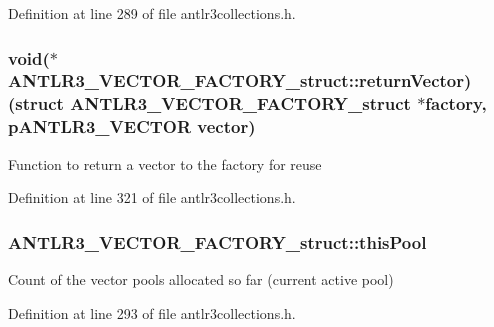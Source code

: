 Definition at line 289 of file antlr3collections.\-h.

\hypertarget{struct_a_n_t_l_r3___v_e_c_t_o_r___f_a_c_t_o_r_y__struct_a682d89800cb9cc07d495788265ad02b5}{
\subsubsection[{return\-Vector}]{\setlength{\rightskip}{0pt plus 5cm}void($\ast$ A\-N\-T\-L\-R3\-\_\-\-V\-E\-C\-T\-O\-R\-\_\-\-F\-A\-C\-T\-O\-R\-Y\-\_\-struct\-::return\-Vector)(struct {\bf A\-N\-T\-L\-R3\-\_\-\-V\-E\-C\-T\-O\-R\-\_\-\-F\-A\-C\-T\-O\-R\-Y\-\_\-struct} $\ast$factory, {\bf p\-A\-N\-T\-L\-R3\-\_\-\-V\-E\-C\-T\-O\-R} {\bf vector})}}\label{struct_a_n_t_l_r3___v_e_c_t_o_r___f_a_c_t_o_r_y__struct_a682d89800cb9cc07d495788265ad02b5}
Function to return a vector to the factory for reuse 

Definition at line 321 of file antlr3collections.\-h.

\hypertarget{struct_a_n_t_l_r3___v_e_c_t_o_r___f_a_c_t_o_r_y__struct_a853f11c3f176318a279cca18bbc66e7d}{
\subsubsection[{this\-Pool}]{ A\-N\-T\-L\-R3\-\_\-\-V\-E\-C\-T\-O\-R\-\_\-\-F\-A\-C\-T\-O\-R\-Y\-\_\-struct\-::this\-Pool}}\label{struct_a_n_t_l_r3___v_e_c_t_o_r___f_a_c_t_o_r_y__struct_a853f11c3f176318a279cca18bbc66e7d}
Count of the vector pools allocated so far (current active pool) 

Definition at line 293 of file antlr3collections.\-h.

